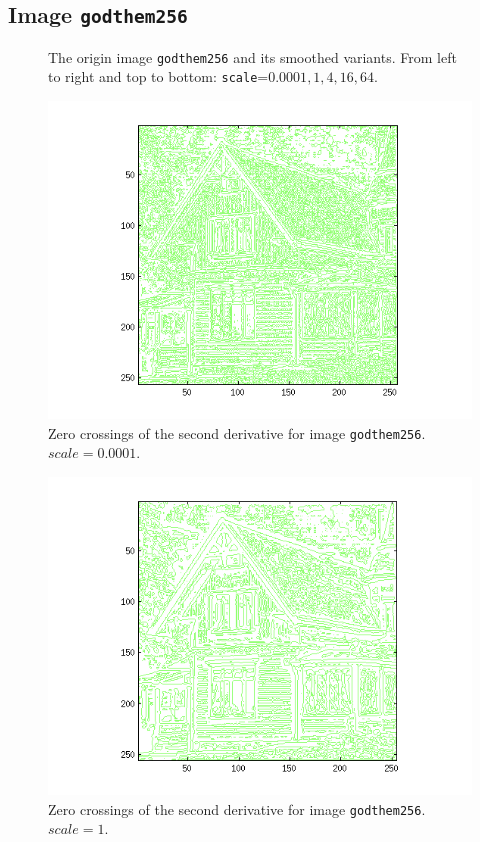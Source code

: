 
\subsection{Image \texttt{godthem256}}

\begin{figure}[H]
	\centering
  \scalebox{0.8}{}
  \caption{The origin image \texttt{godthem256} and its smoothed variants.
    From left to right and top to bottom: \texttt{scale}=$0.0001, 1, 4, 16, 64$.}
	\label{fig:Q4_smoothed_house}
\end{figure}


\begin{figure}[H]
	\centering
	\includegraphics[scale=0.8]{./images/Q4/vv/0.0001.png}
	\caption{Zero crossings of the second derivative for image \texttt{godthem256}. $scale = 0.0001$.}
	\label{fig:Q4_vv_0.0001}
\end{figure}

\begin{figure}[H]
	\centering
	\includegraphics[scale=0.8]{./images/Q4/vv/1.png}
	\caption{Zero crossings of the second derivative for image \texttt{godthem256}. $scale = 1$.}
	\label{fig:Q4_vv_1}
\end{figure}

